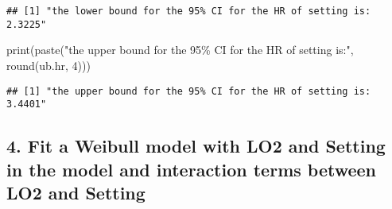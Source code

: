 \documentclass[
]{article}
\newenvironment{Shaded}{\begin{snugshade}}{\end{snugshade}}
\newcommand{\AttributeTok}[1]{\textcolor[rgb]{0.77,0.63,0.00}{#1}}
\newcommand{\DecValTok}[1]{\textcolor[rgb]{0.00,0.00,0.81}{#1}}
\newcommand{\FunctionTok}[1]{\textcolor[rgb]{0.00,0.00,0.00}{#1}}
\newcommand{\NormalTok}[1]{#1}
\newcommand{\OtherTok}[1]{\textcolor[rgb]{0.56,0.35,0.01}{#1}}
\newcommand{\SpecialCharTok}[1]{\textcolor[rgb]{0.00,0.00,0.00}{#1}}
\newcommand{\StringTok}[1]{\textcolor[rgb]{0.31,0.60,0.02}{#1}}
\begin{document}
\begin{verbatim}
## [1] "the lower bound for the 95% CI for the HR of setting is: 2.3225"
\end{verbatim}

\begin{Shaded}
\begin{Highlighting}[]
\FunctionTok{print}\NormalTok{(}\FunctionTok{paste}\NormalTok{(}\StringTok{"the upper bound for the 95\% CI for the HR of setting is:"}\NormalTok{, }\FunctionTok{round}\NormalTok{(ub.hr,}
    \DecValTok{4}\NormalTok{)))}
\end{Highlighting}
\end{Shaded}

\begin{verbatim}
## [1] "the upper bound for the 95% CI for the HR of setting is: 3.4401"
\end{verbatim}

\hypertarget{fit-a-weibull-model-with-lo2-and-setting-in-the-model-and-interaction-terms-between-lo2-and-setting}{%
\subsection{4. Fit a Weibull model with LO2 and Setting in the model and
interaction terms between LO2 and
Setting}\label{fit-a-weibull-model-with-lo2-and-setting-in-the-model-and-interaction-terms-between-lo2-and-setting}}

\begin{Shaded}
\end{Shaded}
\end{document}
